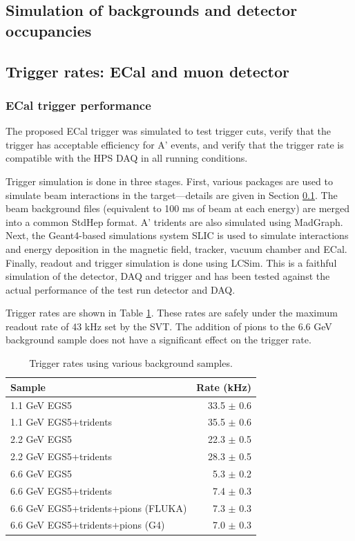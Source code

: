 
\subsection{Simulation of backgrounds and detector occupancies}
\label{sec:backgrounds}


\subsection{Trigger rates: ECal and muon detector}
\subsubsection{ECal trigger performance}

The proposed ECal trigger was simulated to test trigger cuts, verify that the trigger has acceptable efficiency for A' events, and verify that the trigger rate is compatible with the HPS DAQ in all running conditions.

Trigger simulation is done in three stages. 
First, various packages are used to simulate beam interactions in the target---details are given in Section \ref{sec:backgrounds}.
The beam background files (equivalent to 100 ms of beam at each energy) are merged into a common StdHep format. 
A' tridents are also simulated using MadGraph. 
Next, the Geant4-based simulations system SLIC \cite{slic} is used to simulate interactions and energy deposition in the magnetic field, tracker, vacuum chamber and ECal. 
Finally, readout and trigger simulation is done using LCSim.
This is a faithful simulation of the detector, DAQ and trigger and has been tested against the actual performance of the test run detector and DAQ.

Trigger rates are shown in Table \ref{tab:trigrates}. These rates are safely under the maximum readout rate of 43 kHz set by the SVT. 
The addition of pions to the 6.6 GeV background sample does not have a significant effect on the trigger rate.

\begin{table}
	\begin{tabular}{|l|r|}
		\hline
		Sample &  Rate (kHz)\\
		\hline
		1.1 GeV	EGS5 				& 33.5 $\pm$ 0.6	\\
		1.1 GeV EGS5+tridents			& 35.5 $\pm$ 0.6	\\
		2.2 GeV	EGS5 				& 22.3 $\pm$ 0.5	\\
		2.2 GeV EGS5+tridents			& 28.3 $\pm$ 0.5	\\
		6.6 GeV	EGS5 				& 5.3 $\pm$ 0.2	\\
		6.6 GeV EGS5+tridents			& 7.4 $\pm$ 0.3	\\
		6.6 GeV EGS5+tridents+pions (FLUKA)	& 7.3 $\pm$ 0.3	\\
		6.6 GeV EGS5+tridents+pions (G4)	& 7.0 $\pm$ 0.3	\\
		\hline
	\end{tabular}
	\caption{ {\small Trigger rates using various background samples. }
	\label{tab:trigrates}}
\end{table}

